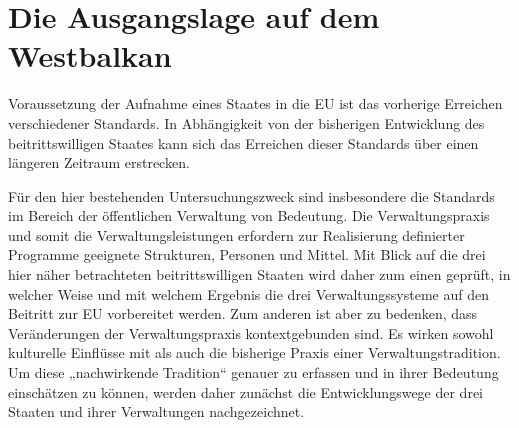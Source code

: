 \chapter{Die Ausgangslage auf dem Westbalkan }
Voraussetzung der Aufnahme eines Staates in die EU ist das vorherige Erreichen verschiedener Standards. In Abhängigkeit von der bisherigen Entwicklung des beitrittswilligen Staates kann sich das Erreichen dieser Standards über einen längeren Zeitraum erstrecken.\par
Für den hier bestehenden Untersuchungszweck sind insbesondere die Standards im Bereich der öffentlichen Verwaltung von Bedeutung. Die Verwaltungspraxis und somit die Verwaltungsleistungen erfordern zur Realisierung definierter Programme geeignete Strukturen, Personen und Mittel. Mit Blick auf die drei hier näher betrachteten beitrittswilligen Staaten wird daher zum einen geprüft, in welcher Weise und mit welchem Ergebnis die drei Verwaltungssysteme auf den Beitritt zur EU vorbereitet werden. Zum anderen ist aber zu bedenken, dass Veränderungen der Verwaltungspraxis kontextgebunden sind. Es wirken sowohl kulturelle Einflüsse mit als auch die bisherige Praxis einer Verwaltungstradition. Um diese „nachwirkende Tradition“ genauer zu erfassen und in ihrer Bedeutung einschätzen zu können, werden daher zunächst die Entwicklungswege der drei Staaten und ihrer Verwaltungen nachgezeichnet.\par
